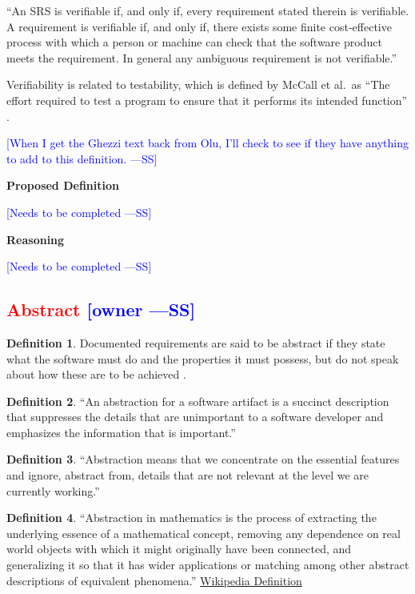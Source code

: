 \documentclass[letterpaper,cleveref]{lipics-v2019}
\newcommand{\authornote}[3]{\textcolor{#1}{[#3 ---#2]}}
\newcommand{\authornote}[3]{}
\newcommand{\wss}[1]{\authornote{blue}{SS}{#1}} %
\newcommand{\notdone}[1]{\textcolor{red}{#1}}
\theoremstyle{definition}
\newtheorem{defn}{Definition}
\begin{document}
``An SRS is verifiable if, and only if, every requirement stated therein is
verifiable. A requirement is verifiable if, and only if, there exists some
finite cost-effective process with which a person or machine can check that the
software product meets the requirement. In general any ambiguous requirement is
not verifiable.'' \citep{IEEE1998}

Verifiability is related to testability, which is defined by McCall et al.\ as
``The effort required to test a program to ensure that it performs its intended
function'' \citep{VanVliet2000}.  

\wss{When I get the Ghezzi text back from Olu,
  I'll check to see if they have anything to add to this definition.}

\noindent \textbf{Proposed Definition} 

\wss{Needs to be completed}

\noindent \textbf{Reasoning}

\wss{Needs to be completed}

\subsection{\notdone{Abstract} \wss{owner}}

\begin{defn}
Documented requirements are said to be abstract if they state what the software
must do and the properties it must possess, but do not speak about how these are
to be achieved \citep{GhezziEtAl2003}.  
\end{defn}

\begin{defn}
``An abstraction for a software artifact is a succinct description that suppresses
the details that are unimportant to a software developer and emphasizes the
information that is important.'' \citep{Krueger1992}
\end{defn}

\begin{defn}
``Abstraction means that we concentrate on the essential features and ignore,
abstract from, details that are not relevant at the level we are currently
working.''  \citep[p.\ 296]{VanVliet2000}
\end{defn}

\begin{defn}
``Abstraction in mathematics is the process of extracting the underlying essence
of a mathematical concept, removing any dependence on real world objects with
which it might originally have been connected, and generalizing it so that it
has wider applications or matching among other abstract descriptions of
equivalent phenomena.''
\href{https://en.wikipedia.org/wiki/Abstraction_(mathematics)} {Wikipedia
  Definition}
\end{defn}
\end{document}
